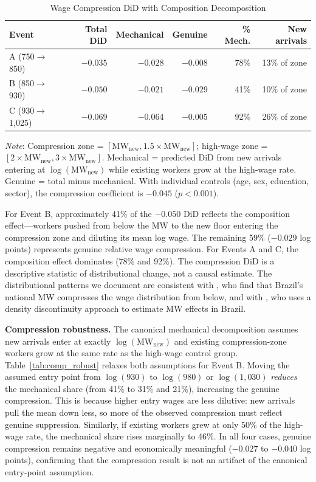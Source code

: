 \documentclass[12pt]{article}
\begin{document}
\begin{table}[H]
\centering
\caption{Wage Compression DiD with Composition Decomposition}
\label{tab:compression}
\begin{threeparttable}
\begin{tabular}{lrrrrr}
\toprule
Event & Total DiD & Mechanical & Genuine & \% Mech. & New arrivals \\
\midrule
A (750$\to$850)   & $-0.035$ & $-0.028$ & $-0.008$ & 78\% & 13\% of zone \\
B (850$\to$930)   & $-0.050$ & $-0.021$ & $-0.029$ & 41\% & 10\% of zone \\
C (930$\to$1,025) & $-0.069$ & $-0.064$ & $-0.005$ & 92\% & 26\% of zone \\
\bottomrule
\end{tabular}
\begin{tablenotes}
\small
\item \textit{Note}: Compression zone = $[\text{MW}_\text{new}, 1.5 \times \text{MW}_\text{new}]$; high-wage zone = $[2 \times \text{MW}_\text{new}, 3 \times \text{MW}_\text{new}]$. Mechanical = predicted DiD from new arrivals entering at $\log(\text{MW}_\text{new})$ while existing workers grow at the high-wage rate. Genuine = total minus mechanical. With individual controls (age, sex, education, sector), the compression coefficient is $-0.045$ ($p < 0.001$).
\end{tablenotes}
\end{threeparttable}
\end{table}

For Event B, approximately 41\% of the $-0.050$ DiD reflects the composition effect---workers pushed from below the MW to the new floor entering the compression zone and diluting its mean log wage. The remaining 59\% ($-0.029$ log points) represents genuine relative wage compression. For Events A and C, the composition effect dominates (78\% and 92\%). The compression DiD is a descriptive statistic of distributional change, not a causal estimate. The distributional patterns we document are consistent with \citet{engbom2022}, who find that Brazil's national MW compresses the wage distribution from below, and with \citet{jales2018}, who uses a density discontinuity approach to estimate MW effects in Brazil.

\textbf{Compression robustness.} The canonical mechanical decomposition assumes new arrivals enter at exactly $\log(\text{MW}_\text{new})$ and existing compression-zone workers grow at the same rate as the high-wage control group. Table~\ref{tab:comp_robust} relaxes both assumptions for Event B. Moving the assumed entry point from $\log(930)$ to $\log(980)$ or $\log(1{,}030)$ \textit{reduces} the mechanical share (from 41\% to 31\% and 21\%), increasing the genuine compression. This is because higher entry wages are less dilutive: new arrivals pull the mean down less, so more of the observed compression must reflect genuine suppression. Similarly, if existing workers grew at only 50\% of the high-wage rate, the mechanical share rises marginally to 46\%. In all four cases, genuine compression remains negative and economically meaningful ($-0.027$ to $-0.040$ log points), confirming that the compression result is not an artifact of the canonical entry-point assumption.
\end{document}
